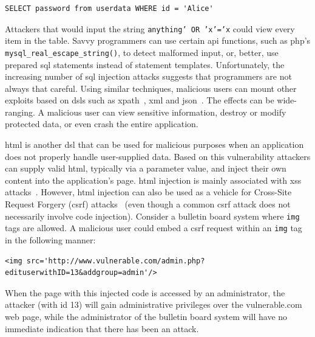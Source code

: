 \documentclass[10pt,journal,compsoc]{IEEEtran}
\begin{document}
\lstset{language=SQL}
\begin{lstlisting}
SELECT password from userdata WHERE id = 'Alice'
\end{lstlisting}
\vspace{-1mm}
\noindent
Attackers that would input the string {\tt anything' OR 'x'='x}
could view every item in the table.
Savvy programmers can use certain {\sc api} functions, such as {\sc php}'s
{\tt mysql\_real\_escape\_string()}, to detect malformed input, or,
better, use prepared {\sc sql} statements instead of statement
templates. Unfortunately, the increasing number of {\sc sql} injection
attacks suggests that programmers are not always that careful. Using
similar techniques, malicious users can mount other exploits based on
{\sc dsl}s such as {\sc xp}ath~\cite{SW06},
{\sc xml} and {\sc json}~\cite{SMS13}. The effects can be
wide-ranging. A malicious user can view sensitive information, destroy
or modify protected data, or even crash the entire application.

{\sc html} is another {\sc dsl} that can be used for malicious
purposes when an application does not properly handle user-supplied
data. Based on this vulnerability attackers can supply valid {\sc
  html}, typically via a parameter value, and inject their own content
into the application's page. {\sc html} injection is mainly associated
with {\sc xss} attacks~\cite{SLMS14}. However, {\sc html} injection
can also be used as a vehicle for Cross-Site Request Forgery
({\sc csrf}) attacks~\cite{LZRL09}
(even though a common {\sc csrf} attack does not necessarily
involve code injection).
Consider a bulletin board system where {\tt img} tags are allowed.
A malicious user could embed a {\sc csrf} request within an
{\tt img} tag in the following manner:
\vspace{-0.5mm}
\lstset{language=HTML}
\begin{lstlisting}
<img src='http://www.vulnerable.com/admin.php?edituserwithID=13&addgroup=admin'/>
\end{lstlisting}
\vspace{-1mm}
\noindent
When the page with this injected code is accessed by an administrator,
the attacker (with {\sc id} 13) will gain administrative privileges
over the vulnerable.com web page,
while the administrator of the bulletin board system
will have no immediate indication that there has been an attack.
\end{document}

